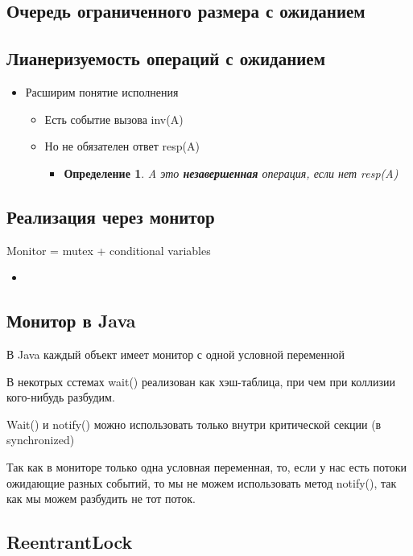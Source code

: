 \documentclass[10pt,a4paper,oneside,titlepage]{article}
\theoremstyle{plain}
\theoremstyle{defenition}
\newtheorem*{defenition}{Определение}
\begin{document}
\subsection{Очередь ограниченного размера с ожиданием}

\subsection{Лианеризуемость операций с ожиданием}
\begin{itemize}
	\item Расширим понятие исполнения
	\begin{itemize}
		\item Есть событие вызова inv(A)
		\item Но не обязателен ответ resp(A)
		\begin{itemize}
			\item\begin{defenition}
				A это {\bfseries незавершенная} операция, если нет resp(A)
			\end{defenition}
		\end{itemize}
	\end{itemize}
\end{itemize}

\subsection{Реализация через монитор}
Monitor = mutex + conditional variables
\begin{itemize}
	
	\item
\end{itemize}

\subsection{Монитор в Java}
В Java каждый объект имеет монитор с одной условной переменной

В некотрых сстемах wait() реализован как хэш-таблица, при чем при коллизии кого-нибудь разбудим.

Wait() и notify() можно использовать только внутри критической секции (в synchronized)

Так как в мониторе только одна условная переменная, то, если у нас есть потоки ожидающие разных событий, то мы не можем использовать метод notify(), так как мы можем разбудить не тот поток.

\subsection{ReentrantLock}
\end{document}
